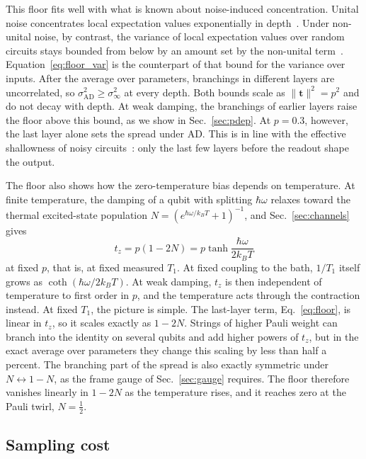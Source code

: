 \documentclass[
 aps,pra,
 twocolumn,
 superscriptaddress,
 longbibliography,
 nofootinbib
]{revtex4-2}
\newcommand{\AD}{\mathrm{AD}}
\begin{document}
This floor fits well with what is
known about noise-induced concentration. Unital noise concentrates local
expectation values exponentially in
depth~\cite{wang2021noiseinduced,schumann2024emergence}. Under non-unital
noise, by contrast, the variance of local expectation values over random
circuits stays bounded from below by an amount set by the non-unital
term~\cite{mele2026noise}. Equation~\eqref{eq:floor_var} is the counterpart of
that bound for the variance over inputs. After the average over parameters,
branchings in different layers are uncorrelated, so
$\sigma_{\AD}^2\ge\sigma_\infty^2$ at every depth. Both bounds scale as
$\lVert\mathbf t\rVert^2=p^2$ and do not decay with depth. At weak damping, the
branchings of earlier layers raise the floor above this bound, as we show in
Sec.~\ref{sec:pdep}. At $p=0.3$, however, the last
layer alone sets the spread under AD. This is in line with the
effective shallowness of noisy circuits~\cite{mele2026noise}: only the last few
layers before the readout shape the output.

The floor also shows how the zero-temperature bias
depends on temperature. At finite temperature, the damping of a qubit with
splitting $\hbar\omega$ relaxes toward the thermal excited-state population
$N=(e^{\hbar\omega/k_BT}+1)^{-1}$, and Sec.~\ref{sec:channels} gives
\begin{equation}
t_z=p(1-2N)=p\tanh\frac{\hbar\omega}{2k_BT}
\label{eq:tz}
\end{equation}
at fixed $p$, that is, at fixed measured $T_1$. At fixed coupling to the bath,
$1/T_1$ itself grows as $\coth(\hbar\omega/2k_BT)$. At weak damping, $t_z$ is
then independent of temperature to first order in $p$, and the temperature
acts through the contraction instead. At fixed $T_1$, the picture is simple. The last-layer term,
Eq.~\eqref{eq:floor}, is linear in $t_z$, so it scales exactly as $1-2N$.
Strings of higher Pauli weight can branch into the identity on several qubits
and add higher powers of $t_z$, but in the exact average over parameters they
change this scaling by less than half a percent.
The branching part of the spread
is also exactly symmetric under $N\leftrightarrow1-N$, as the frame gauge of
Sec.~\ref{sec:gauge} requires. The floor therefore vanishes linearly in $1-2N$
as the temperature rises, and it reaches zero at the Pauli twirl,
$N=\frac12$.

\subsection{Sampling cost}
\label{sec:shots}
\end{document}

